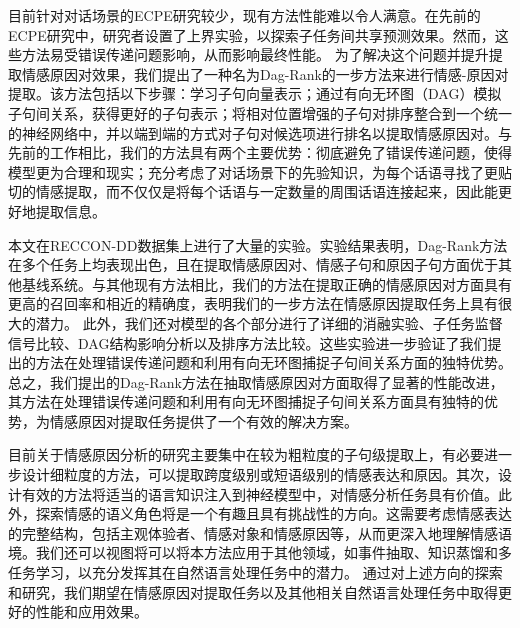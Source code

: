 



目前针对对话场景的ECPE研究较少，现有方法性能难以令人满意。在先前的ECPE研究中，研究者设置了上界实验，以探索子任务间共享预测效果。然而，这些方法易受错误传递问题影响，从而影响最终性能。
为了解决这个问题并提升提取情感原因对效果，我们提出了一种名为Dag-Rank的一步方法来进行情感-原因对提取。该方法包括以下步骤：学习子句向量表示；通过有向无环图（DAG）模拟子句间关系，获得更好的子句表示；将相对位置增强的子句对排序整合到一个统一的神经网络中，并以端到端的方式对子句对候选项进行排名以提取情感原因对。与先前的工作相比，我们的方法具有两个主要优势：彻底避免了错误传递问题，使得模型更为合理和现实；充分考虑了对话场景下的先验知识，为每个话语寻找了更贴切的情感提取，而不仅仅是将每个话语与一定数量的周围话语连接起来，因此能更好地提取信息。

 本文在RECCON-DD数据集上进行了大量的实验。实验结果表明，Dag-Rank方法在多个任务上均表现出色，且在提取情感原因对、情感子句和原因子句方面优于其他基线系统。与其他现有方法相比，我们的方法在提取正确的情感原因对方面具有更高的召回率和相近的精确度，表明我们的一步方法在情感原因提取任务上具有很大的潜力。
此外，我们还对模型的各个部分进行了详细的消融实验、子任务监督信号比较、DAG结构影响分析以及排序方法比较。这些实验进一步验证了我们提出的方法在处理错误传递问题和利用有向无环图捕捉子句间关系方面的独特优势。
总之，我们提出的Dag-Rank方法在抽取情感原因对方面取得了显著的性能改进，其方法在处理错误传递问题和利用有向无环图捕捉子句间关系方面具有独特的优势，为情感原因对提取任务提供了一个有效的解决方案。


目前关于情感原因分析的研究主要集中在较为粗粒度的子句级提取上，有必要进一步设计细粒度的方法，可以提取跨度级别或短语级别的情感表达和原因。其次，设计有效的方法将适当的语言知识注入到神经模型中，对情感分析任务具有价值。此外，探索情感的语义角色将是一个有趣且具有挑战性的方向。这需要考虑情感表达的完整结构，包括主观体验者、情感对象和情感原因等，从而更深入地理解情感语境。我们还可以视图将可以将本方法应用于其他领域，如事件抽取、知识蒸馏和多任务学习，以充分发挥其在自然语言处理任务中的潜力。
通过对上述方向的探索和研究，我们期望在情感原因对提取任务以及其他相关自然语言处理任务中取得更好的性能和应用效果。

